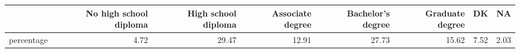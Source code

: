 \begin{table}[ht]
\centering
\begin{tabular}{rrrrrrrr}
  \hline
 & No high school diploma & High school diploma & Associate degree & Bachelor's degree & Graduate degree & DK & NA \\ 
  \hline
percentage & 4.72 & 29.47 & 12.91 & 27.73 & 15.62 & 7.52 & 2.03 \\ 
   \hline
\end{tabular}
\end{table}
